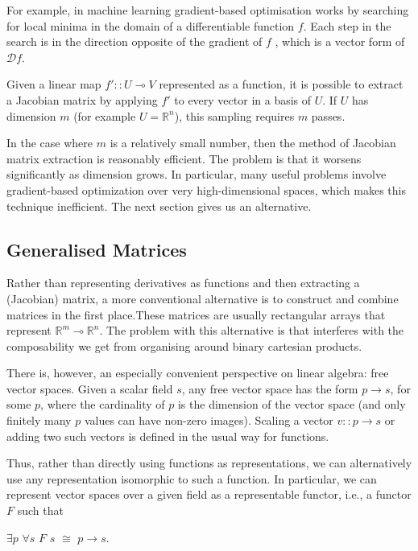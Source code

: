 \documentclass[11pt,a4]{article}
\def\R{\mathbb{R}}
\theoremstyle{definition}
\theoremstyle{Definition}
\theoremstyle{Definition}
\begin{document}
	For example, in machine learning gradient-based optimisation works by searching for local
	minima in the domain of a differentiable function $f$. Each step in the search is in the direction opposite of the gradient of $f$ ,
	which is a vector form of $\mathcal{D} f$.
	
	Given a linear map $f' :: U \multimap V$ represented as a function, it is possible to extract a Jacobian matrix by applying $f'$ to every vector in a basis of $U$. If $U$ has dimension $m$ (for example $U=\R^n$), this sampling requires $m$ passes. 
	\par In the case where $m$ is a relatively small number, then the method of Jacobian matrix extraction is reasonably efficient. The problem is that it worsens significantly as dimension grows. In particular, many useful problems involve gradient-based optimization over very high-dimensional spaces, which makes this technique inefficient. The next section gives us an alternative.
	
	\newpage
	
	\subsection{Generalised Matrices}
	
	Rather than representing derivatives as functions and then extracting a (Jacobian) matrix, a more
	conventional alternative is to construct and combine matrices in the first place.These matrices are
	usually rectangular arrays that represent $ \R^m \multimap \R^n$. The problem with this alternative is that interferes with the composability we get from organising around binary cartesian products.
	\par There is, however, an especially convenient perspective on linear algebra: free vector spaces. Given a scalar field $s$, any free vector space has the form $p \to s$, for some $p$, where the cardinality of $p$ is the dimension of the vector space (and only finitely many $p$ values can have non-zero images). Scaling a vector $v :: p \to s$ or adding two such vectors is defined in the usual way for functions.
	
	\par Thus, rather than directly using functions as representations, we can alternatively use any representation isomorphic to such a function. In particular, we can represent vector spaces over a given field as a representable functor, i.e., a functor $F$ such that
	
	$\exists p$ $\forall s$ $F$ $s$ $\cong$ $p \to s$.
	
\end{document}
